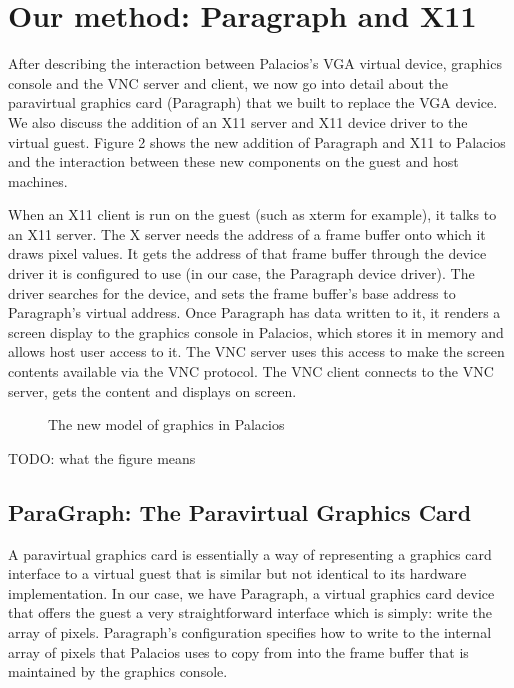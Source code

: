 \documentclass{acm_proc_article-sp}
\begin{document}
\section{Our method: Paragraph and X11}
After describing the interaction between Palacios's VGA virtual device, graphics console and the VNC server and client, we now go into detail
about the paravirtual graphics card (Paragraph) that we built to replace the VGA 
device. We also discuss the addition of an X11 server and X11 device driver to
the virtual guest. Figure 2 shows the new addition of Paragraph and X11 to
Palacios and the interaction between these new components on the guest and host
machines. 
\par
When an X11 client is run on the guest (such as xterm for example), it talks to
an X11 server. The X server needs the address of a frame buffer onto which it
draws pixel values. It gets the address of that frame buffer through the device
driver it is configured to use (in our case, the Paragraph device driver). The 
driver searches for the device, and sets the frame buffer's base address to
Paragraph's virtual address. Once Paragraph has data written to it, it renders a
screen display to the graphics console in Palacios, which stores it in memory
and allows host user access to it. The VNC server uses this access to make the 
screen contents available via the VNC protocol. The VNC client connects to the 
VNC server, gets the content and displays on screen.
\begin{figure}[h]                                              
\centering                                                     
{}                   
\caption{The new model of graphics in Palacios}   
\end{figure}                                                   
 TODO: what the figure means
\subsection{ParaGraph: The Paravirtual Graphics Card}
A paravirtual graphics card is essentially a way of representing a graphics card
interface to a virtual guest that is similar but not identical to its hardware
implementation. In our case, we have Paragraph, a virtual graphics card device
that offers the guest a very straightforward interface which is simply: write
the array of pixels. Paragraph's configuration specifies how to write to the
internal array of pixels that Palacios uses to copy from into the frame buffer
that is maintained by the graphics console. \\
\end{document}
